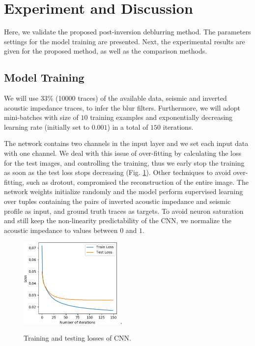 \documentclass[journal]{IEEEtran}
\begin{document}
\section{Experiment and Discussion}\label{Experiments}
Here, we validate the proposed post-inversion deblurring method.
The parameters settings for the model training are presented.
Next, the experimental results are given for the proposed method,
as well as the comparison methods.

\subsection{Model Training}
We will use $33$\% (10000 traces)
of the available data, seismic and inverted acoustic impedance traces,
to infer the blur filters. Furthermore, we will adopt 
mini-batches with size of $10$ training examples and exponentially
decreasing learning rate (initially set to $0.001$)
in a total of $150$ iterations.

The network contains two channels in the input layer and we set
each input data with one channel.
We deal with this issue of over-fitting by calculating
the loss for the test images, and controlling the training,
thus we early stop the training as soon as the test loss
stops decreasing (Fig. \ref{ImLoss}).
Other techniques to avoid over-fitting, such as
drotout, compromised the reconstruction of the entire image.
The network weights initialize randomly and the model perform supervised
learning over tuples containing the pairs of inverted acoustic
impedance and seismic profile as input, and ground truth traces as targets.
To avoid neuron saturation and still keep the non-linearity predictability
of the CNN, we normalize the acoustic impedance to values between $0$ and $1$.
\begin{figure}[!t]
\centering
\includegraphics[width=2.0in]{Figs/LossAcc}
\DeclareGraphicsExtensions.
\caption{Training and testing losses of CNN.}
\label{ImLoss}
\end{figure}
\end{document}
